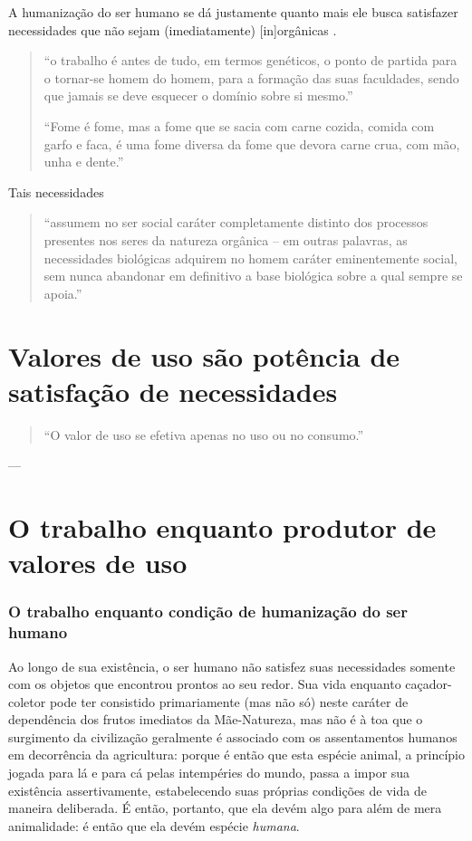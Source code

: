 A humanização do ser humano se dá justamente quanto mais ele busca satisfazer necessidades que não sejam (imediatamente) [in]orgânicas \parencite{Lukacs2012}.
\begin{quote}
``o trabalho é antes de tudo, em termos genéticos, o ponto de partida para o tornar-se homem do homem, para a formação das suas faculdades, sendo que jamais se deve esquecer o domínio sobre si mesmo.'' \parencite[p. 348]{Lukacs2012}

``Fome é fome, mas a fome que se sacia com carne cozida, comida com garfo e faca, é uma fome diversa da fome que devora carne crua, com mão, unha e dente.'' \parencite[ ]{Marx2021}
\end{quote}

Tais necessidades
\begin{quote}
“assumem no ser social caráter completamente distinto dos processos presentes nos seres da natureza orgânica – em outras palavras, as necessidades biológicas adquirem no homem caráter eminentemente social, sem nunca abandonar em definitivo a base biológica sobre a qual sempre se apoia.” \parencite[p. 58]{Fortes2016}
\end{quote}

\section{Valores de uso são potência de satisfação de necessidades}
\begin{quote}
``O valor de uso se efetiva apenas no uso ou no consumo.'' \parencite[p. 114]{Marx2017}
\end{quote}

---
\section{O trabalho enquanto produtor de valores de uso}
\subsubsection{O trabalho enquanto condição de humanização do ser humano}
Ao longo de sua existência, o ser humano não satisfez suas necessidades somente com os objetos que encontrou prontos ao seu redor. Sua vida enquanto caçador-coletor pode ter consistido primariamente (mas não só) neste caráter de dependência dos frutos imediatos da Mãe-Natureza, mas não é à toa que o surgimento da civilização geralmente é associado com os assentamentos humanos em decorrência da agricultura: porque é então que esta espécie animal, a princípio jogada para lá e para cá pelas intempéries do mundo, passa a impor sua existência assertivamente, estabelecendo suas próprias condições de vida de maneira deliberada. É então, portanto, que ela devém algo para além de mera animalidade: é então que ela devém espécie \textit{humana}. 


